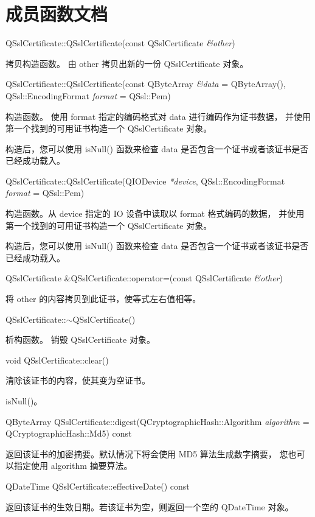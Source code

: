 
\section{成员函数文档}

QSslCertificate::QSslCertificate(const QSslCertificate \emph{\&other})

拷贝构造函数。
由 other 拷贝出新的一份 QSslCertificate 对象。

QSslCertificate::QSslCertificate(const QByteArray 
\emph{\&data} = QByteArray(), QSsl::EncodingFormat \emph{format} = QSsl::Pem)

构造函数。
使用 format 指定的编码格式对 data 进行编码作为证书数据，
并使用第一个找到的可用证书构造一个 QSslCertificate 对象。

构造后，您可以使用 isNull() 函数来检查 data 是否包含一个证书或者该证书是否已经成功载入。

QSslCertificate::QSslCertificate(QIODevice \emph{*device}, 
QSsl::EncodingFormat \emph{format} = QSsl::Pem)

构造函数。从 device 指定的 IO 设备中读取以 format 格式编码的数据，
并使用第一个找到的可用证书构造一个 QSslCertificate 对象。

构造后，您可以使用 isNull() 函数来检查 data 是否包含一个证书或者该证书是否已经成功载入。

QSslCertificate \&QSslCertificate::operator=(const QSslCertificate \emph{\&other})

将 other 的内容拷贝到此证书，使等式左右值相等。

QSslCertificate::$\sim$QSslCertificate()

析构函数。
销毁 QSslCertificate 对象。

void QSslCertificate::clear()

清除该证书的内容，使其变为空证书。

\begin{seeAlso}
isNull()。
\end{seeAlso}

QByteArray QSslCertificate::digest(QCryptographicHash::Algorithm 
\emph{algorithm} = QCryptographicHash::Md5) const

返回该证书的加密摘要。默认情况下将会使用 MD5 算法生成数字摘要，
您也可以指定使用 algorithm 摘要算法。

QDateTime QSslCertificate::effectiveDate() const

返回该证书的生效日期。若该证书为空，则返回一个空的 QDateTime 对象。

